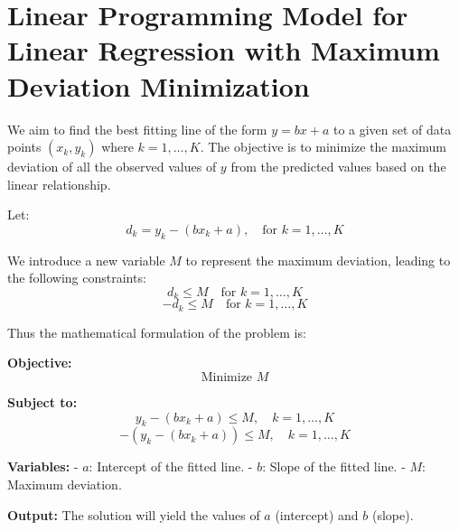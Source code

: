 \documentclass{article}
\begin{document}
\section*{Linear Programming Model for Linear Regression with Maximum Deviation Minimization}

We aim to find the best fitting line of the form \( y = bx + a \) to a given set of data points \((x_k, y_k)\) where \( k = 1, \ldots, K \). The objective is to minimize the maximum deviation of all the observed values of \( y \) from the predicted values based on the linear relationship.

Let:
\[
d_k = y_k - (bx_k + a), \quad \text{for } k = 1, \ldots, K
\]

We introduce a new variable \( M \) to represent the maximum deviation, leading to the following constraints:
\[
d_k \leq M \quad \text{for } k = 1, \ldots, K
\]
\[
-d_k \leq M \quad \text{for } k = 1, \ldots, K
\]

Thus the mathematical formulation of the problem is:

\textbf{Objective:}
\[
\text{Minimize } M
\]

\textbf{Subject to:}
\[
y_k - (bx_k + a) \leq M, \quad k = 1, \ldots, K
\]
\[
-(y_k - (bx_k + a)) \leq M, \quad k = 1, \ldots, K
\]

\textbf{Variables:}
- \( a \): Intercept of the fitted line.
- \( b \): Slope of the fitted line.
- \( M \): Maximum deviation.

\textbf{Output:}
The solution will yield the values of \( a \) (intercept) and \( b \) (slope).
\end{document}
